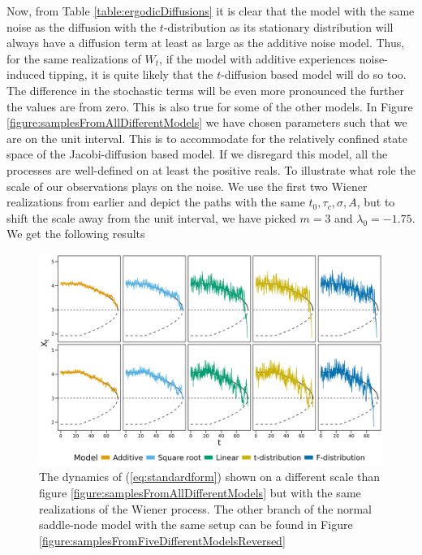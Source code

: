 Now, from Table \ref{table:ergodicDiffusions} it is clear that the model with the same noise as the diffusion with the $t$-distribution as its stationary distribution will always have a diffusion term at least as large as the additive noise model. Thus, for the same realizations of $W_t$, if the model with additive experiences noise-induced tipping, it is quite likely that the $t$-diffusion based model will do so too. The difference in the stochastic terms will be even more pronounced the further the values are from zero. This is also true for some of the other models. In Figure \ref{figure:samplesFromAllDifferentModels} we have chosen parameters such that we are on the unit interval. This is to accommodate for the relatively confined state space of the Jacobi-diffusion based model. If we disregard this model, all the processes are well-defined on at least the positive reals. To illustrate what role the scale of our observations plays on the noise. We use the first two Wiener realizations from earlier and depict the paths with the same $t_0, \tau_c, \sigma, A$, but to shift the scale away from the unit interval, we have picked $m = 3$ and $\lambda_0 = -1.75$. We get the following results
\begin{figure}[h]
    \begin{center}
        \includegraphics[scale = .08]{figures/sample_paths_plot_big_scale.jpeg}
        \caption{The dynamics of (\ref{eq:standardform}) shown on a different scale than figure \ref{figure:samplesFromAllDifferentModels} but with the same realizations of the Wiener process. The other branch of the normal saddle-node model with the same setup can be found in Figure \ref{figure:samplesFromFiveDifferentModelsReversed}}
        \label{figure:samplesFromFiveDifferentModels}
    \end{center}
\end{figure}\\
